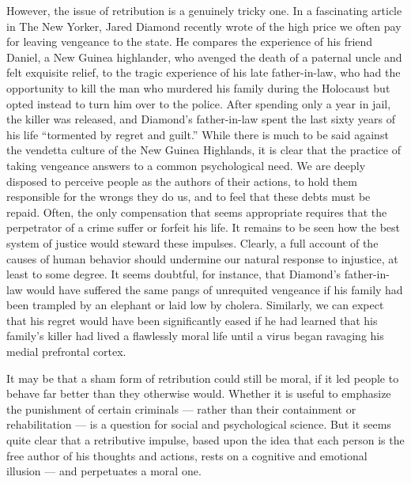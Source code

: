 \documentclass[a4paper,14pt]{extbook}
\begin{document}
However, the issue of retribution is a genuinely tricky one.
In a fascinating article in The New Yorker, Jared Diamond recently wrote of the high price we often pay for leaving vengeance to the state.
He compares the experience of his friend Daniel, a New Guinea highlander, who avenged the death of a paternal uncle and felt exquisite relief, to the tragic experience of his late father-in-law, who had the opportunity to kill the man who murdered his family during the Holocaust but opted instead to turn him over to the police.
After spending only a year in jail, the killer was released, and Diamond’s father-in-law spent the last sixty years of his life ``tormented by regret and guilt.''
While there is much to be said against the vendetta culture of the New Guinea Highlands, it is clear that the practice of taking vengeance answers to a common psychological need.
We are deeply disposed to perceive people as the authors of their actions, to hold them responsible for the wrongs they do us, and to feel that these debts must be repaid.
Often, the only compensation that seems appropriate requires that the perpetrator of a crime suffer or forfeit his life.
It remains to be seen how the best system of justice would steward these impulses.
Clearly, a full account of the causes of human behavior should undermine our natural response to injustice, at least to some degree.
It seems doubtful, for instance, that Diamond’s father-in-law would have suffered the same pangs of unrequited vengeance if his family had been trampled by an elephant or laid low by cholera.
Similarly, we can expect that his regret would have been significantly eased if he had learned that his family’s killer had lived a flawlessly moral life until a virus began ravaging his medial prefrontal cortex.

It may be that a sham form of retribution could still be moral, if it led people to behave far better than they otherwise would.
Whether it is useful to emphasize the punishment of certain criminals --- rather than their containment or rehabilitation --- is a question for social and psychological science.
But it seems quite clear that a retributive impulse, based upon the idea that each person is the free author of his thoughts and actions, rests on a cognitive and emotional illusion --- and perpetuates a moral one.
\end{document}
